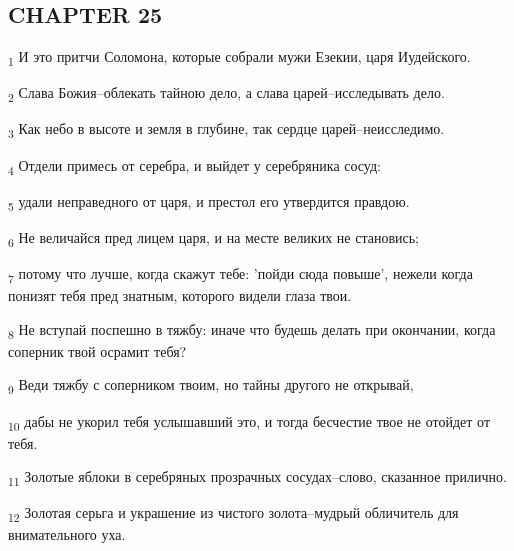 \subsection{CHAPTER 25}
\begin{tcolorbox}
\textsubscript{1} И это притчи Соломона, которые собрали мужи Езекии, царя Иудейского.
\end{tcolorbox}
\begin{tcolorbox}
\textsubscript{2} Слава Божия--облекать тайною дело, а слава царей--исследывать дело.
\end{tcolorbox}
\begin{tcolorbox}
\textsubscript{3} Как небо в высоте и земля в глубине, так сердце царей--неисследимо.
\end{tcolorbox}
\begin{tcolorbox}
\textsubscript{4} Отдели примесь от серебра, и выйдет у серебряника сосуд:
\end{tcolorbox}
\begin{tcolorbox}
\textsubscript{5} удали неправедного от царя, и престол его утвердится правдою.
\end{tcolorbox}
\begin{tcolorbox}
\textsubscript{6} Не величайся пред лицем царя, и на месте великих не становись;
\end{tcolorbox}
\begin{tcolorbox}
\textsubscript{7} потому что лучше, когда скажут тебе: 'пойди сюда повыше', нежели когда понизят тебя пред знатным, которого видели глаза твои.
\end{tcolorbox}
\begin{tcolorbox}
\textsubscript{8} Не вступай поспешно в тяжбу: иначе что будешь делать при окончании, когда соперник твой осрамит тебя?
\end{tcolorbox}
\begin{tcolorbox}
\textsubscript{9} Веди тяжбу с соперником твоим, но тайны другого не открывай,
\end{tcolorbox}
\begin{tcolorbox}
\textsubscript{10} дабы не укорил тебя услышавший это, и тогда бесчестие твое не отойдет от тебя.
\end{tcolorbox}
\begin{tcolorbox}
\textsubscript{11} Золотые яблоки в серебряных прозрачных сосудах--слово, сказанное прилично.
\end{tcolorbox}
\begin{tcolorbox}
\textsubscript{12} Золотая серьга и украшение из чистого золота--мудрый обличитель для внимательного уха.
\end{tcolorbox}
